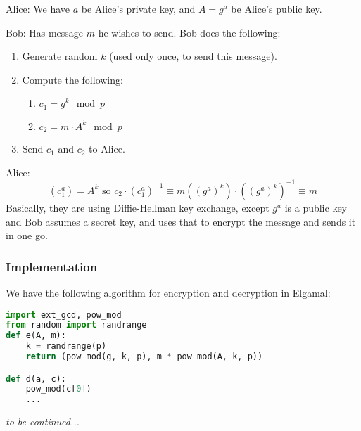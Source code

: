 Alice: We have $a$ be Alice's private key, and $A = g^a$ be Alice's public key.

Bob: Has message $m$ he wishes to send. Bob does the following:
\begin{enumerate}
    \item Generate random $k$ (used only once, to send this message).
    \item Compute the following:
          \begin{enumerate}
              \item $c_1 = g^k\mod{p}$
              \item $c_2 = m\cdot A^k \mod{p}$
          \end{enumerate}
    \item Send $c_1$ and $c_2$ to Alice.
\end{enumerate}

Alice:
\[(c_1^a) = A^k \text{ so } c_2\cdot (c_1^a)^{-1}\equiv m\left((g^a)^k\right)\cdot \left((g^a)^k\right)^{-1} \equiv m\]
Basically, they are using Diffie-Hellman key exchange, except $g^a$ is a public key and Bob assumes a secret key, and uses that to encrypt the message and sends it in one go.

\subsubsection{Implementation}
We have the following algorithm for encryption and decryption in Elgamal: 
\begin{lstlisting}[language=Python]
import ext_gcd, pow_mod
from random import randrange
def e(A, m): 
    k = randrange(p)
    return (pow_mod(g, k, p), m * pow_mod(A, k, p))

def d(a, c):
    pow_mod(c[0])
    ...
\end{lstlisting}
\emph{to be continued...}